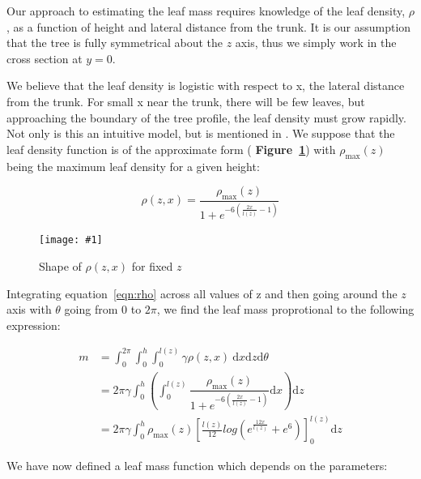 \documentclass[10pt]{article}
\numberwithin{equation}{subsection}
\newlength{\imgwidth}
\newcommand{\scalegraphics}[1]{%
    \settowidth{\imgwidth}{\texttt{[image: \#1]}}%
    \setlength{\imgwidth}{\minof{\imgwidth}{\columnwidth}}%
    \texttt{[image: \#1]}%
}
\begin{document}
Our approach to estimating the leaf mass requires knowledge of the
leaf density, $\rho$, as a function of height and lateral distance
from the trunk. It is our assumption that the tree is fully
symmetrical about the $z$ axis, thus we simply work in the cross
section at $y=0$.

We believe that the leaf density is logistic with respect to x, the
lateral distance from the trunk. For small x near the trunk, there
will be few leaves, but approaching the boundary of the tree profile,
the leaf density must grow rapidly. Not only is this an intuitive
model, but is mentioned in \citep{sigmoid02}. We suppose that the leaf
density function is of the approximate form ({\bf
  Figure~\ref{fig:rho}}) with $\rho_{\mathrm{max}}(z)$ being the maximum leaf
density for a given height:

\begin{center}
  \begin{equation}
    \rho(z,x) = \dfrac{\rho_{\mathrm{max}}(z)}{1+e^{-6(\frac{2x}{l(z)}-1)}} \label{eqn:rho}
  \end{equation}
\end{center}


\begin{figure}[h!]
  \centering
  \scalegraphics{img/rho.png}
  \caption{Shape of $\rho(z,x)$ for fixed $z$}
  \label{fig:rho}
\end{figure}


Integrating equation~\eqref{eqn:rho} across all values of z and then
going around the $z$ axis with $\theta$ going from 0 to $2\pi$, we
find the leaf mass proprotional to the following expression:

\begin{center}
  \begin{equation}
    \begin{split}
      m &= \int_0^{2\pi} \int_0^{h} \int_0^{l(z)} \gamma \rho(z,x) \ \mathrm{d}x \mathrm{d}z \mathrm{d}\theta \\
      &= 2\pi\gamma \int_0^{h} \left(\int_0^{l(z)} \dfrac{\rho_{\mathrm{max}}(z)}{1+e^{-6(\frac{2x}{l(z)}-1)}} \mathrm{d}x\right) \mathrm{d}z \\
      &= 2\pi\gamma \int_0^{h} \rho_{\mathrm{max}}(z) \left[ \frac{l(z)}{12} log\left( e^{\frac{12x}{l(z)}} + e^6 \right) \right]_0^{l(z)} \mathrm{d}z
    \end{split}
  \end{equation}
\end{center}

We have now defined a leaf mass function which depends on the
parameters:
\end{document}
